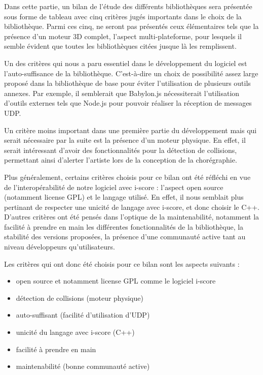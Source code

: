 Dans cette partie, un bilan de l'étude des différents bibliothèques sera présentée sous forme de tableau avec cinq critères jugés importants dans le choix de la bibliothèque. Parmi ces cinq, ne seront pas présentés ceux élémentaires tels que la présence d'un moteur 3D complet, l'aspect multi-plateforme, pour lesquels il semble évident que toutes les bibliothèques citées jusque là les remplissent.

Un des critères qui nous a paru essentiel dans le développement du logiciel est l'auto-suffisance de la bibliothèque. C'est-à-dire un choix de possibilité assez large proposé dans la bibliothèque de base pour éviter l'utilisation de plusieurs outils annexes. Par exemple, il semblerait que Babylon.js nécessiterait l'utilisation d'outils externes tels que Node.js pour pouvoir réaliser la réception de messages UDP. 

Un critère moins important dans une première partie du développement mais qui serait nécessaire par la suite est la présence d'un moteur physique. En effet, il serait intéressant d'avoir des fonctionnalités pour la détection de collisions, permettant ainsi d'alerter l'artiste lors de la conception de la chorégraphie.

Plus généralement, certains critères choisis pour ce bilan ont été réfléchi en vue de l'interopérabilité de notre logiciel avec i-score : l'aspect open source (notamment license GPL) et le langage utilisé. En effet, il nous semblait plus pertinant de respecter une unicité de langage avec i-score, et donc choisir le C++. 
D'autres critères ont été pensés dans l'optique de la maintenabilité, notamment la facilité à prendre en main les différentes fonctionnalités de la bibliothèque, la stabilité des versions proposées, la présence d'une communauté active tant au niveau développeurs qu'utilisateurs.



Les critères qui ont donc été choisis pour ce bilan sont les aspects suivants : 
\begin{itemize}
\item open source et notamment license GPL comme le logiciel i-score 
\item détection de collisions (moteur physique)
\item auto-suffisant (facilité d'utilisation d'UDP)
\item unicité du langage avec i-score (C++)
\item facilité à prendre en main
\item maintenabilité (bonne communauté active)
\end{itemize} 
 

